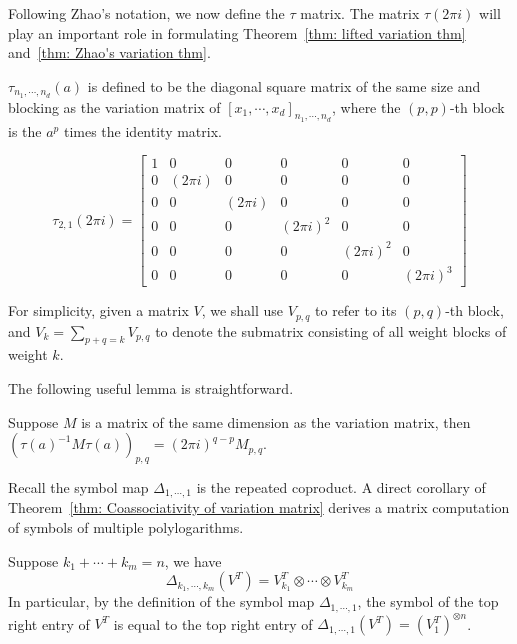 Following Zhao's notation, we now define the $\tau$ matrix. The matrix $\tau(2\pi i)$ will play an important role in formulating Theorem~\ref{thm: lifted variation thm} and~\ref{thm: Zhao's variation thm}.

\begin{definition}
$\tau_{n_1,\cdots,n_d}(a)$ is defined to be the diagonal square matrix of the same size and blocking as the variation matrix of $[x_1,\cdots,x_d]_{n_1,\cdots,n_d}$, where the $(p,p)$-th block is the $a^p$ times the identity matrix.
\end{definition}

\begin{example}
\[
\tau_{2,1}(2\pi i)=\left[
\begin{array}{c|cc|cc|c}
1&0&0&0&0&0\\
\hline
0&(2\pi i)&0&0&0&0\\
0&0&(2\pi i)&0&0&0\\
\hline
0&0&0&(2\pi i)^2&0&0\\
0&0&0&0&(2\pi i)^2&0\\
\hline
0&0&0&0&0&(2\pi i)^3
\end{array}
\right]
\]
\end{example}

For simplicity, given a matrix $V$, we shall use $V_{p,q}$ to refer to its $(p,q)$-th block, and $V_k=\sum_{p+q=k}V_{p,q}$ to denote the submatrix consisting of all weight blocks of weight $k$.

The following useful lemma is straightforward.

\begin{lemma}\label{lem: tau^{-1}M tau}
Suppose $M$ is a matrix of the same dimension as the variation matrix, then $(\tau(a)^{-1}M\tau(a))_{p,q}=(2\pi i)^{q-p}M_{p,q}$.
\end{lemma}

Recall the symbol map $\Delta_{1,\cdots,1}$ is the repeated coproduct. A direct corollary of Theorem~\ref{thm: Coassociativity of variation matrix} derives a matrix computation of symbols of multiple polylogarithms.

\begin{corollary}\label{cor: iterated coproduct of the variation matrix}
Suppose $k_1+\cdots+k_m=n$, we have
\[
\Delta_{k_1,\cdots,k_m}(V^T)=V_{k_1}^T\otimes\cdots\otimes V^T_{k_m}
\]
In particular, by the definition of the symbol map $\Delta_{1,\cdots,1}$, the symbol of the top right entry of $V^T$ is equal to the top right entry of $\Delta_{1,\cdots,1}(V^T)=(V_1^T)^{\otimes n}$.
\end{corollary}

